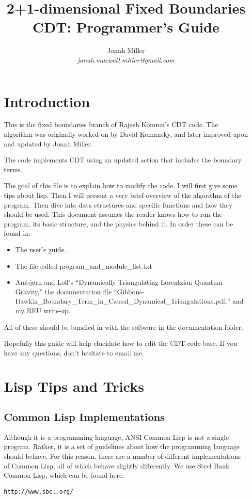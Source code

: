 \documentclass[12pt]{article}
\author{Jonah Miller\\
\textit{jonah.maxwell.miller@gmail.com}}
\title{2+1-dimensional Fixed Boundaries CDT: Programmer's Guide}
\begin{document}
\maketitle

\section{Introduction}
\label{s:intro}

This is the fixed boundaries branch of Rajesh Kommu's CDT code. The
algorithm was originally worked on by David Kemansky, and later
improved upon and updated by Jonah Miller.

The code implements CDT using an updated action that includes the
boundary terms.

The goal of this file is to explain how to modify the code. I will
first give some tips about lisp. Then I will present a very brief
overview of the algorithm of the program. Then dive into data
structures and specific functions and how they should be used. This
document assumes the reader knows how to run the program, its basic
structure, and the physics behind it. In order these can be found in:
\begin{itemize}
\item The user's guide.
\item The file called program\_and\_module\_list.txt
\item Ambj\o rn and Loll's ``Dynamically Triangulating Lorentzian
  Quantum Gravity,'' the documentation file
  ``Gibbons-Hawkin\_Boundary\_Term\_in\_Causal\_Dynamical\_Triangulations.pdf,''
  and my REU write-up.
\end{itemize}
All of these should be bundled in with the software in the
documentation folder.

Hopefully this guide will help elucidate how to edit the CDT
code-base. If you have any questions, don't hesitate to email me.

\section{Lisp Tips and Tricks}
\label{s:lisp:tricks}
\subsection{Common Lisp Implementations}

Although it is a programming language, ANSI Common Lisp is not a
single program. Rather, it is a set of guidelines about how the
programming language should behave. For this reason, there are a
number of different implementations of Common Lisp, all of which
behave slightly differently. We use Steel Bank Common Lisp, which can
be found here:
\begin{verbatim}
http://www.sbcl.org/
\end{verbatim}
\end{document}
